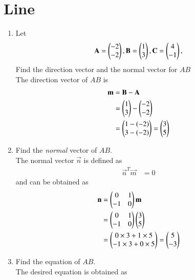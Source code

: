 \documentclass[journal,12pt,twocolumn]{IEEEtran}
\renewcommand\thesection{\arabic{section}}
\begin{document}
\section{Line}
\begin{enumerate}[label=\thesection.\arabic*
,ref=\thesection.\theenumi]
%
\item
\label{prob:draw_triangle}
Let
\begin{equation}
\mathbf{A} =
\begin{pmatrix}-2\\-2\end{pmatrix},
\mathbf{B} =
\begin{pmatrix}1\\3\end{pmatrix},
\mathbf{C} =
\begin{pmatrix}4\\-1\end{pmatrix},
\end{equation}
%
Find the direction vector and the normal vector for $AB$
\\
\solution 
The direction vector of $AB$ is 
\begin{align}
\label{eq:dir_vec}
\mathbf{m} &= \mathbf{B}-\mathbf{A} 
\\
&=  
\begin{pmatrix}1 \\ 3\end{pmatrix} - \begin{pmatrix}-2\\-2\end{pmatrix}
\\
&= \begin{pmatrix}1-(-2)\\3-(-2)\end{pmatrix}=\begin{pmatrix}3\\5\end{pmatrix}
\end{align}
%
\item Find the {\em normal} vector of $AB$.
\\
\solution The normal vector $\vec{n}$ is defined as
\begin{align}
\label{eq:line_nor}
\vec{n}^T\vec{m} &= 0
\end{align}
and can be obtained as
\begin{align}
\mathbf{n}&= \begin{pmatrix}0 & 1 \\ -1 & 0\end{pmatrix}\mathbf{m} 
\\
&=\begin{pmatrix}0 & 1 \\ -1 & 0\end{pmatrix}\begin{pmatrix}3\\5\end{pmatrix}
\\
&= \begin{pmatrix}0\times 3 + 1 \times 5  \\ -1\times 3 + 0 \times 5\end{pmatrix}=\begin{pmatrix}5\\-3\end{pmatrix}
\end{align}
\item Find the equation of $AB$.
\\
\solution  The desired equation is obtained as
\begin{align}

\end{align}
\end{enumerate}
\end{document}
